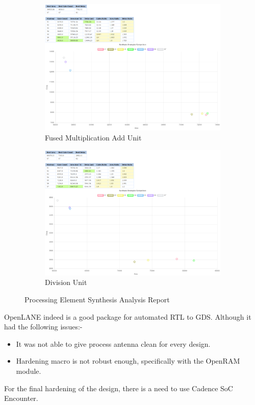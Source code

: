 \begin{figure}
\begin{subfigure}{.5\textwidth}
	\centering
	\includegraphics[width=.8\linewidth]{./ASIC/MAC.png}
	\caption{Fused Multiplication Add Unit}
  \end{subfigure}%
  \begin{subfigure}{.5\textwidth}
	\centering
	\includegraphics[width=.8\linewidth]{./ASIC/DIV.png}
	\caption{Division Unit}
  \end{subfigure}
  \caption{Processing Element Synthesis Analysis Report}
\end{figure}

OpenLANE indeed is a good package for automated RTL to GDS. Although it had the following issues:-
\begin{itemize}
  \itemsep0em
  \item It was not able to give process antenna clean for every design.
  \item Hardening macro is not robust enough, specifically with the OpenRAM module.
\end{itemize}
For the final hardening of the design, there is a need to use Cadence SoC Encounter.

